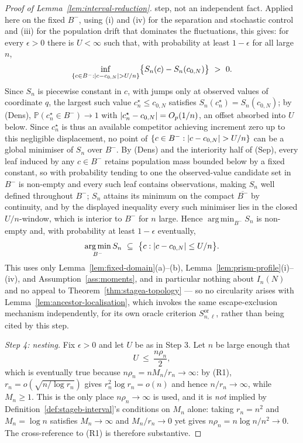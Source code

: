 \documentclass[11pt]{article}
\theoremstyle{plain}
\theoremstyle{definition}
\theoremstyle{remark}
\newcommand{\PP}{\mathbb{P}}
\DeclareMathOperator*{\argmin}{arg\,min}
\DeclarePairedDelimiter{\abs}{\lvert}{\rvert}
\begin{document}
\begin{proof}[Proof of Lemma~\ref{lem:interval-reduction}]
step, not an independent fact. Applied here on the fixed $B^-$, using (i) and
(iv) for the separation and stochastic control and (iii) for the population
drift that dominates the fluctuations, this gives: for every $\epsilon>0$
there is $U<\infty$ such that, with probability at least $1-\epsilon$ for all
large $n$,
\[
  \inf_{\{c\in B^-:\abs{c-c_{0,N}}>U/n\}}
  \bigl\{S_n(c)-S_n(c_{0,N})\bigr\}\ >\ 0.
\]
Since $S_n$ is piecewise constant in $c$, with jumps only at observed values
of coordinate $q$, the largest such value $c^\star_n\le c_{0,N}$ satisfies
$S_n(c^\star_n)=S_n(c_{0,N})$; by (Dens), $\PP(c^\star_n\in B^-)\to1$ with
$\abs{c^\star_n-c_{0,N}}=O_p(1/n)$, an offset absorbed into $U$ below. Since
$c^\star_n$ is thus an available competitor achieving increment zero up to
this negligible displacement, no point of
$\{c\in B^-:\abs{c-c_{0,N}}>U/n\}$ can be a global minimiser of $S_n$ over
$B^-$. By (Dens) and the interiority half of (Sep), every leaf induced by any
$c\in B^-$ retains population mass bounded below by a fixed constant, so
with probability tending to one the observed-value candidate set in $B^-$ is
non-empty and every such leaf contains observations, making $S_n$ well
defined throughout $B^-$; $S_n$ attains its minimum on the compact
$\overline{B^-}$ by continuity, and by the displayed inequality every such
minimiser lies in the closed $U/n$-window, which is interior to $B^-$ for $n$
large. Hence $\argmin_{B^-}S_n$ is non-empty and, with probability at least
$1-\epsilon$ eventually,
\[
  \argmin_{B^-}S_n\ \subseteq\ \bigl\{c:\abs{c-c_{0,N}}\le U/n\bigr\}.
\]
This uses only Lemma~\ref{lem:fixed-domain}(a)--(b),
Lemma~\ref{lem:prism-profile}(i)--(iv), and Assumption~\ref{ass:moments}, and
in particular nothing about $I_n(N)$ and no appeal to
Theorem~\ref{thm:stagea-topology} --- so no circularity arises with
Lemma~\ref{lem:ancestor-localisation}, which invokes the same
escape-exclusion mechanism independently, for its own oracle criterion
$S^{\mathrm{or}}_{n,\ell}$, rather than being cited by this step.

\emph{Step 4: nesting.} Fix $\epsilon>0$ and let $U$ be as in Step 3. Let $n$
be large enough that
\[
  U\ \le\ \frac{n\rho_n}{2},
\]
which is eventually true because $n\rho_n=nM_n/r_n\to\infty$: by (R1),
$r_n=o(\sqrt{n/\log r_n})$ gives $r_n^2\log r_n=o(n)$ and hence
$n/r_n\to\infty$, while $M_n\ge1$. This is the only place
$n\rho_n\to\infty$ is used, and it is \emph{not} implied by
Definition~\ref{def:stageb-interval}'s conditions on $M_n$ alone: taking
$r_n=n^2$ and $M_n=\log n$ satisfies $M_n\to\infty$ and $M_n/r_n\to0$ yet
gives $n\rho_n=n\log n/n^2\to0$. The cross-reference to (R1) is therefore
substantive.


\end{proof}
\end{document}
